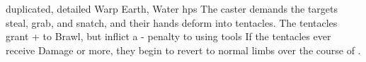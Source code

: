   {duplicated, detailed}%
  {Warp}%
  {Earth, Water}%
  {\glspl{hp}}%
  {The caster demands the targets steal, grab, and snatch, and their hands deform into  tentacles.
  The tentacles grant + to Brawl, but inflict a - penalty to using tools}%
  {
  If the tentacles ever receive  Damage or more, they begin to revert to normal limbs over the course of .}
